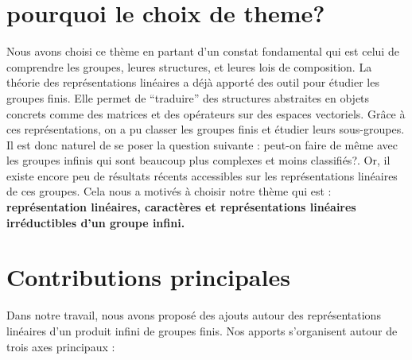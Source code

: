 \documentclass[a4paper, 14pt]{report}
\begin{document}
	
	\section{pourquoi le choix de theme?}
Nous avons choisi ce thème en partant d’un constat fondamental qui est celui de comprendre les groupes, leures structures, et leures lois de composition. La théorie des représentations linéaires a déjà apporté des outil pour étudier les groupes finis. Elle permet de “traduire” des structures abstraites en objets concrets comme des matrices et des opérateurs sur des espaces vectoriels. Grâce à ces représentations, on a pu classer les groupes finis et étudier leurs sous-groupes. Il est donc naturel de se poser la question suivante : peut-on faire de même avec les groupes infinis qui sont beaucoup plus complexes et moins classifiés?. Or, il existe encore peu de résultats récents accessibles sur les représentations linéaires de ces groupes. Cela nous a motivés à choisir notre thème qui est : \textbf{représentation linéaires, caractères et représentations linéaires irréductibles d'un groupe infini.}
	
\section{Contributions principales}
Dans notre travail, nous avons proposé des ajouts  autour des représentations linéaires d’un produit infini de groupes finis. Nos apports s’organisent autour de trois axes principaux :
\end{document}
